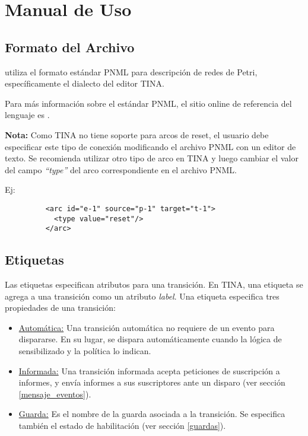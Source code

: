 \section{Manual de Uso}

\subsection{Formato del Archivo}

\javapetriconcurrencymonitor utiliza el formato estándar PNML para descripción
de redes de Petri, específicamente el dialecto del editor TINA\cite{TinaSite}.

Para más información sobre el estándar PNML, el sitio online de referencia del
lenguaje es \cite{PnmlSite}.

\begin{framed}
    \textbf{Nota:}
    Como TINA no tiene soporte para arcos de reset, el usuario debe especificar
    este tipo de conexión modificando el archivo PNML con un editor de texto.
    Se recomienda utilizar otro tipo de arco en TINA y luego cambiar el valor del
    campo \textit{``type''} del arco correspondiente en el archivo PNML.
    
    Ej:
    \begin{figure}[H]
    \centering
    \begin{verbatim}
    <arc id="e-1" source="p-1" target="t-1">
      <type value="reset"/>
    </arc>
    \end{verbatim}
    \end{figure}
\end{framed}

\subsection{Etiquetas}

Las etiquetas especifican atributos para una transición. En TINA, una etiqueta
se agrega a una transición como un atributo \textit{label}.
Una etiqueta especifica tres propiedades de una transición:

\begin{itemize}
    \item \underline{Automática:} Una transición automática no requiere de un
    evento para dispararse. En su lugar, se dispara automáticamente cuando la
    lógica de sensibilizado y la política lo indican.
    \item \underline{Informada:} Una transición informada acepta peticiones de
    suscripción a informes, y envía informes a sus suscriptores ante un disparo
    (ver sección \ref{mensaje_eventos}).
    \item \underline{Guarda:} Es el nombre de la guarda asociada a la
    transición. Se especifica también el estado de habilitación (ver sección
    \ref{guardas}).
\end{itemize}

